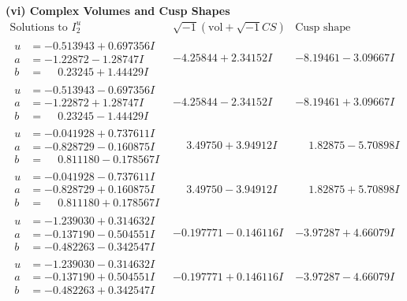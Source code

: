 \documentclass[1p]{elsarticle_modified}
\theoremstyle{definition}
\newcommand{\I}{\sqrt{-1}}
\begin{document}
\newpage\flushleft \textbf{(vi) Complex Volumes and Cusp Shapes}
$$\begin{array}{c|c|c}  
\text{Solutions to }I^u_{2}& \I (\text{vol} + \sqrt{-1}CS) & \text{Cusp shape}\\
 \hline 
\begin{aligned}
u &= -0.513943 + 0.697356 I \\
a &= -1.22872 - 1.28747 I \\
b &= \phantom{-}0.23245 + 1.44429 I\end{aligned}
 & -4.25844 + 2.34152 I & -8.19461 - 3.09667 I \\ \hline\begin{aligned}
u &= -0.513943 - 0.697356 I \\
a &= -1.22872 + 1.28747 I \\
b &= \phantom{-}0.23245 - 1.44429 I\end{aligned}
 & -4.25844 - 2.34152 I & -8.19461 + 3.09667 I \\ \hline\begin{aligned}
u &= -0.041928 + 0.737611 I \\
a &= -0.828729 - 0.160875 I \\
b &= \phantom{-}0.811180 - 0.178567 I\end{aligned}
 & \phantom{-}3.49750 + 3.94912 I & \phantom{-}1.82875 - 5.70898 I \\ \hline\begin{aligned}
u &= -0.041928 - 0.737611 I \\
a &= -0.828729 + 0.160875 I \\
b &= \phantom{-}0.811180 + 0.178567 I\end{aligned}
 & \phantom{-}3.49750 - 3.94912 I & \phantom{-}1.82875 + 5.70898 I \\ \hline\begin{aligned}
u &= -1.239030 + 0.314632 I \\
a &= -0.137190 - 0.504551 I \\
b &= -0.482263 - 0.342547 I\end{aligned}
 & -0.197771 - 0.146116 I & -3.97287 + 4.66079 I \\ \hline\begin{aligned}
u &= -1.239030 - 0.314632 I \\
a &= -0.137190 + 0.504551 I \\
b &= -0.482263 + 0.342547 I\end{aligned}
 & -0.197771 + 0.146116 I & -3.97287 - 4.66079 I \\ \hline\begin{aligned}

\end{aligned}
\end{array}$$
\end{document}
